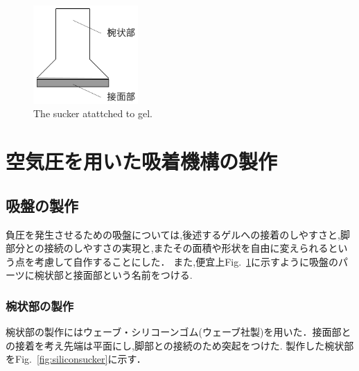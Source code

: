 \documentclass[uplatex,dvipdfmx]{jlreq}
\begin{document}
\begin{figure}
    \centering
    \includegraphics[width=40mm]{./figure/model_sucker.png}
    \caption{The sucker atattched to gel.}
    \label{fig:model_sucker}
\end{figure}

\section{空気圧を用いた吸着機構の製作}
\subsection{吸盤の製作}
負圧を発生させるための吸盤については,後述するゲルへの接着のしやすさと,脚部分との接続のしやすさの実現と,またその面積や形状を自由に変えられるという点を考慮して自作することにした．
また,便宜上Fig.~\ref{fig:model_sucker}に示すように吸盤のパーツに椀状部と接面部という名前をつける.
\subsubsection{椀状部の製作}
椀状部の製作にはウェーブ・シリコーンゴム(ウェーブ社製)を用いた．接面部との接着を考え先端は平面にし,脚部との接続のため突起をつけた.
製作した椀状部をFig.~\ref{fig:siliconsucker}に示す．
\end{document}
